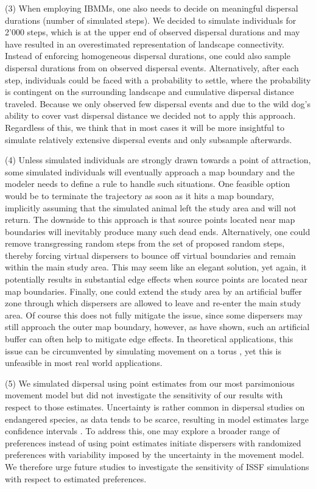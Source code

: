 \documentclass[abstract=on,10pt,a4paper,bibliography=totocnumbered]{article}
\begin{document}
(3) When employing IBMMs, one also needs to decide on meaningful dispersal
durations (number of simulated steps). We decided to simulate individuals for
2'000 steps, which is at the upper end of observed dispersal durations and may
have resulted in an overestimated representation of landscape connectivity.
Instead of enforcing homogeneous dispersal durations, one could also sample
dispersal durations from on observed dispersal events. Alternatively, after each
step, individuals could be faced with a probability to settle, where the
probability is contingent on the surrounding landscape and cumulative dispersal
distance traveled. Because we only observed few dispersal events and due to the
wild dog's ability to cover vast dispersal distance \citep{DaviesMostert.2012,
Masenga.2016, Cozzi.2020} we decided not to apply this approach. Regardless of
this, we think that in most cases it will be more insightful to simulate
relatively extensive dispersal events and only subsample afterwards.

(4) Unless simulated individuals are strongly drawn towards a point of
attraction, some simulated individuals will eventually approach a map boundary
and the modeler needs to define a rule to handle such situations. One feasible
option would be to terminate the trajectory as soon as it hits a map boundary,
implicitly assuming that the simulated animal left the study area and will not
return. The downside to this approach is that source points located near map
boundaries will inevitably produce many such dead ends. Alternatively, one could
remove transgressing random steps from the set of proposed random steps, thereby
forcing virtual dispersers to bounce off virtual boundaries and remain within
the main study area. This may seem like an elegant solution, yet again, it
potentially results in substantial edge effects when source points are located
near map boundaries. Finally, one could extend the study area by an artificial
buffer zone through which dispersers are allowed to leave and re-enter the main
study area. Of course this does not fully mitigate the issue, since some
dispersers may still approach the outer map boundary, however, as
\cite{Koen.2010} have shown, such an artificial buffer can often help to
mitigate edge effects. In theoretical applications, this issue can be
circumvented by simulating movement on a torus \citep{Hodel.2021b}, yet this is
unfeasible in most real world applications.

(5) We simulated dispersal using point estimates from our most parsimonious
movement model but did not investigate the sensitivity of our results with
respect to those estimates. Uncertainty is rather common in dispersal studies on
endangered species, as data tends to be scarce, resulting in model estimates
large confidence intervals \citep{Wiegand.2003, KramerSchadt.2007}. To address
this, one may explore a broader range of preferences instead of using point
estimates initiate dispersers with randomized preferences with variability
imposed by the uncertainty in the movement model. We therefore urge future
studies to investigate the sensitivity of ISSF simulations with respect to
estimated preferences.
\end{document}
